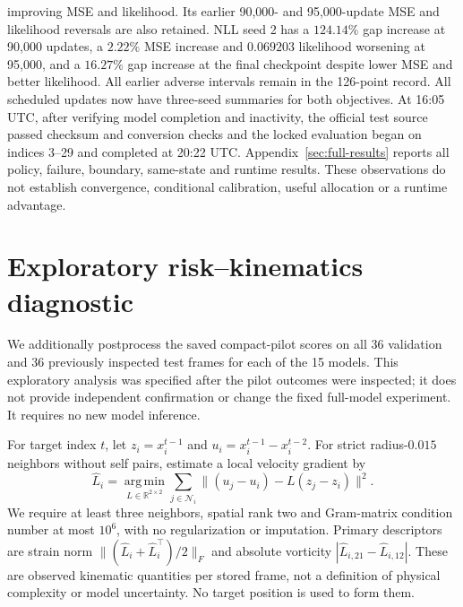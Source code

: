 improving MSE and likelihood. Its earlier 90,000- and 95,000-update MSE
and likelihood reversals are also retained. NLL seed 2 has a
$124.14\%$ gap increase at 90,000 updates, a $2.22\%$ MSE increase
and $0.069203$ likelihood worsening at 95,000, and a $16.27\%$ gap
increase at the final checkpoint despite lower MSE and better likelihood.
All earlier adverse intervals remain in the 126-point record.
All scheduled updates now have three-seed summaries for both objectives.
At 16:05 UTC, after verifying model completion and inactivity, the
official test source passed checksum and conversion checks and the locked
evaluation began on indices 3--29 and completed at 20:22 UTC.
Appendix~\ref{sec:full-results} reports all policy, failure, boundary,
same-state and runtime results. These observations
do not establish convergence, conditional calibration, useful allocation
or a runtime advantage.





\section{Exploratory risk--kinematics diagnostic}
\label{sec:physical-rank}
We additionally postprocess the saved compact-pilot scores on all 36 validation
and 36 previously inspected test frames for each of the 15 models. This
exploratory analysis was specified after the pilot outcomes were inspected;
it does not provide independent confirmation or change the fixed full-model
experiment. It requires no new model inference.

For target index $t$, let $z_i=x_i^{t-1}$ and
$u_i=x_i^{t-1}-x_i^{t-2}$. For strict radius-$0.015$ neighbors without self
pairs, estimate a local velocity gradient by
\begin{equation}
 \widehat L_i=\operatorname*{arg\,min}_{L\in\mathbb R^{2\times2}}
       \sum_{j\in\mathcal N_i}\|(u_j-u_i)-L(z_j-z_i)\|^2.
\end{equation}
We require at least three neighbors, spatial rank two and Gram-matrix
condition number at most $10^6$, with no regularization or imputation.
Primary descriptors are strain norm
$\|({\widehat L_i+\widehat L_i^\top})/2\|_F$ and absolute vorticity
$|\widehat L_{i,21}-\widehat L_{i,12}|$. These are observed kinematic
quantities per stored frame, not a definition of physical complexity or
model uncertainty. No target position is used to form them.

